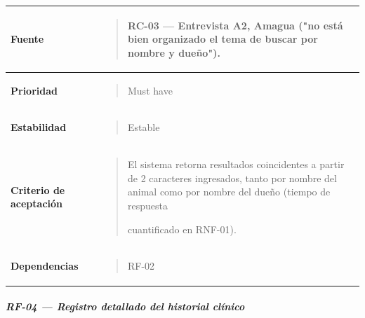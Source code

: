 \documentclass[
]{article}
\newcounter{none} %
\begin{document}
{\def\LTcaptype{none} %
\begin{longtable}[]{@{}
  >{\raggedright\arraybackslash}p{}
  >{\raggedright\arraybackslash}p{}@{}}
\toprule\noalign{}
\begin{minipage}[b]{\linewidth}\raggedright
\textbf{Fuente}
\end{minipage} & \begin{minipage}[b]{\linewidth}\raggedright
\begin{quote}
RC-03 --- Entrevista A2, Amagua ("no está bien organizado el tema de
buscar por nombre y dueño").
\end{quote}
\end{minipage} \\
\midrule\noalign{}
\endhead
\bottomrule\noalign{}
\endlastfoot
\textbf{Prioridad} & \begin{minipage}[t]{\linewidth}\raggedright
\begin{quote}
Must have
\end{quote}
\end{minipage} \\
\textbf{Estabilidad} & \begin{minipage}[t]{\linewidth}\raggedright
\begin{quote}
Estable
\end{quote}
\end{minipage} \\
\textbf{Criterio de aceptación} &
\begin{minipage}[t]{\linewidth}\raggedright
\begin{quote}
El sistema retorna resultados coincidentes a partir de 2 caracteres
ingresados, tanto por nombre del animal como por nombre del dueño
(tiempo de respuesta

cuantificado en RNF-01).
\end{quote}
\end{minipage} \\
\textbf{Dependencias} & \begin{minipage}[t]{\linewidth}\raggedright
\begin{quote}
RF-02
\end{quote}
\end{minipage} \\
\end{longtable}
}

\subparagraph{RF-04 --- Registro detallado del historial
clínico}\label{rf-04-registro-detallado-del-historial-cluxednico}
\end{document}
